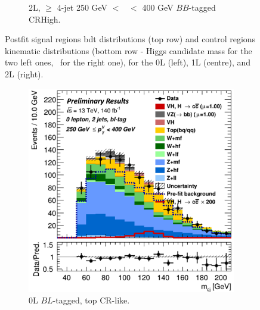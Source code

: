 \begin{figure}[h!]
\begin{subfigure}[b]{0.32\textwidth}
        \caption{2L, $\geq$ 4-jet 250 GeV $<$ \ptv\ $<$ 400 GeV $BB$-tagged CRHigh.}
        \label{fig:posfit_2L_CR}
    \end{subfigure}
    \caption{Postfit signal regions \gls{bdt} distributions (top row) and control regions kinematic distributions (bottom row - Higgs candidate mass for the two left ones, \ptv\ for the right one), for the 0L (left), 1L (centre), and 2L (right).}
    \label{fig:postfit_SR_CR}
\end{figure} 
\begin{figure}[h!]
    \vspace{-0.3cm}
    \centering
    \begin{subfigure}[b]{0.32\textwidth}
        \centering
        \includegraphics[width=\textwidth]{Images/VH/Fit/fromSlides/Postfit/0LtopCRBL.png}
        \caption{0L $BL$-tagged, top CR-like.}
        \label{fig:val_BLtopCR}
    \end{subfigure}
    \begin{subfigure}[b]{0.32\textwidth}
        \centering

\end{subfigure}
\end{figure}
